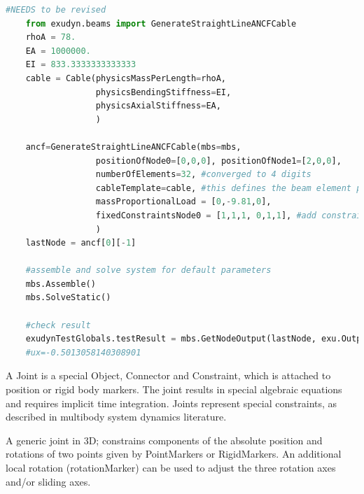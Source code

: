 \begin{lstlisting}[language=Python, firstnumber=1]
    #NEEDS to be revised
    from exudyn.beams import GenerateStraightLineANCFCable
    rhoA = 78.
    EA = 1000000.
    EI = 833.3333333333333
    cable = Cable(physicsMassPerLength=rhoA, 
                  physicsBendingStiffness=EI, 
                  physicsAxialStiffness=EA, 
                  )

    ancf=GenerateStraightLineANCFCable(mbs=mbs,
                  positionOfNode0=[0,0,0], positionOfNode1=[2,0,0],
                  numberOfElements=32, #converged to 4 digits
                  cableTemplate=cable, #this defines the beam element properties
                  massProportionalLoad = [0,-9.81,0],
                  fixedConstraintsNode0 = [1,1,1, 0,1,1], #add constraints for pos and rot (r'_y,r'_z)
                  )
    lastNode = ancf[0][-1]

    #assemble and solve system for default parameters
    mbs.Assemble()
    mbs.SolveStatic()

    #check result
    exudynTestGlobals.testResult = mbs.GetNodeOutput(lastNode, exu.OutputVariableType.Displacement)[0]
    #ux=-0.5013058140308901
\end{lstlisting}


\newpage
A Joint is a special Object, Connector and Constraint, which is attached to position or rigid body markers. The joint results in special algebraic equations and requires implicit time integration. Joints represent special constraints, as described in multibody system dynamics literature.


\label{sec:item:ObjectJointGeneric}
A generic joint in 3D; constrains components of the absolute position and rotations of two points given by PointMarkers or RigidMarkers. An additional local rotation (rotationMarker) can be used to adjust the three rotation axes and/or sliding axes.
\vspace{12pt}\\

